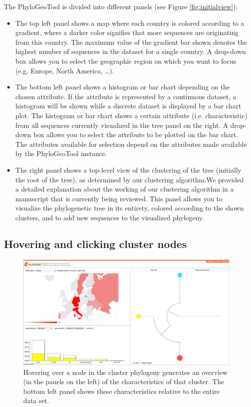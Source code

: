 \documentclass[a4paper, 11pt]{article} %
\begin{document}
The PhyloGeoTool is divided into different panels (see Figure \ref{fig:initialview}): 
\begin{itemize}
  \item The top left panel shows a map where each country is colored according to a gradient, where a darker color signifies that more sequences are originating from this country. The maximum value of the gradient bar shown denotes the highest number of sequences in the dataset for a single country.  
    A drop-down box allows you to select the geographic region on which you want to focus (e.g. Europe, North America, \ldots).
  \item The bottom left panel shows a histogram or bar chart depending on the chosen attribute. If the attribute is represented by a continuous dataset, a histogram will be shown while a discrete dataset is displayed by a bar chart plot.
  The histogram or bar chart shows a certain attribute (i.e. characteristic) from all sequences currently visualized in the tree panel on the right. 
  A drop-down box allows you to select the attribute to be plotted on the bar chart. 
  The attributes available for selection depend on the attributes made available by the PhyloGeoTool instance.
  \item The right panel shows a top-level view of the clustering of the tree (initially the root of the tree), as determined by our clustering algorithm.We provided a detailed explanation about the working of our clustering algorithm in a manuscript that is currently being reviewed. %
This panel allows you to visualize the phylogenetic tree in its entirety, colored according to the shown clusters, and to add new sequences to the visualized phylogeny.
\end{itemize}


\subsection{Hovering and clicking cluster nodes}
\begin{figure}[H]
\centering
\includegraphics[scale=0.1875]{images/hover_node.PNG}
\vspace{-0.75cm}
\caption{Hovering over a node in the cluster phylogeny generates an overview (in the panels on the left) of the characteristics of that cluster. The bottom left panel shows these characteristics relative to the entire data set.}
\label{fig:hovernode}
\end{figure}
\end{document}

